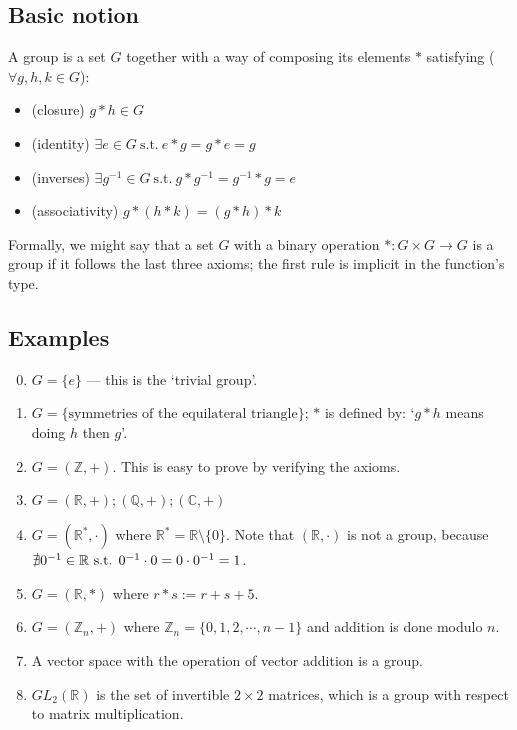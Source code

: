\subsection{Basic notion}
\begin{definition}[Group]
	A group is a set \(G\) together with a way of composing its elements \(\ast\) satisfying (\(\forall g, h, k \in G\)):
	\begin{itemize}
		\item (closure) \(g \ast h \in G\)
		\item (identity) \(\exists e \in G \mathrm{\ s.t.\ } e \ast g = g \ast e = g\)
		\item (inverses) \(\exists g^{-1} \in G \mathrm{\ s.t.\ } g \ast g^{-1} = g^{-1} \ast g = e\)
		\item (associativity) \(g \ast (h \ast k) = (g \ast h) \ast k\)
	\end{itemize}
\end{definition}

Formally, we might say that a set \(G\) with a binary operation \(\ast : G \times G \to G\) is a group if it follows the last three axioms; the first rule is implicit in the function's type.

\subsection{Examples}
\begin{enumerate}
	\setcounter{enumi}{-1}
	\item \(G = \{ e \}\) --- this is the `trivial group'.
	\item \(G = \{ \text{symmetries of the equilateral triangle} \} \); \(\ast\) is defined by: `\(g \ast h\) means doing \(h\) then \(g\)'.
	\item \(G = (\mathbb Z, +)\).
	      This is easy to prove by verifying the axioms.
	\item \(G = (\mathbb R, +); (\mathbb Q, +); (\mathbb C, +)\)
	\item \(G = (\mathbb R^*, \cdot)\) where \(\mathbb R^* = \mathbb R \setminus \{ 0\}\).
	      Note that \((\mathbb R, \cdot)\) is not a group, because \(\nexists 0^{-1} \in \mathbb R \text{ s.t. } 0^{-1} \cdot 0 = 0 \cdot 0^{-1} = 1\).
	\item \(G = (\mathbb R, \ast)\) where \(r \ast s := r + s + 5\).
	\item \(G = (\mathbb Z_n, +)\) where \(\mathbb Z_n = \{ 0, 1, 2, \cdots, n-1 \}\) and addition is done modulo \(n\).
	\item A vector space with the operation of vector addition is a group.
	\item \(GL_2(\mathbb R)\) is the set of invertible \(2\times 2\) matrices, which is a group with respect to matrix multiplication.
\end{enumerate}

